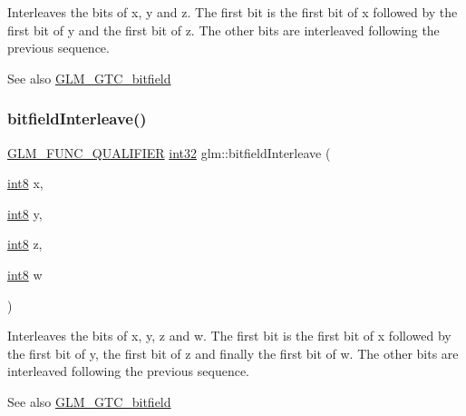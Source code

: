 Interleaves the bits of x, y and z. The first bit is the first bit of x followed by the first bit of y and the first bit of z. The other bits are interleaved following the previous sequence.

\begin{DoxySeeAlso}{See also}
\mbox{\hyperlink{group__gtc__bitfield}{G\+L\+M\+\_\+\+G\+T\+C\+\_\+bitfield}} 
\end{DoxySeeAlso}
\mbox{\label{group__gtc__bitfield_ga7da84ecc2b3a46c9c08a9f40012359cf}} 
\subsubsection{\texorpdfstring{bitfield\+Interleave()}{bitfieldInterleave()}\hspace{0.1cm}{\footnotesize\ttfamily [13/16]}}
{\footnotesize\ttfamily \mbox{\hyperlink{setup_8hpp_a33fdea6f91c5f834105f7415e2a64407}{G\+L\+M\+\_\+\+F\+U\+N\+C\+\_\+\+Q\+U\+A\+L\+I\+F\+I\+ER}} \mbox{\hyperlink{group__gtc__type__precision_ga632d8b25f6b61659f39ea4321fab92a4}{int32}} glm\+::bitfield\+Interleave (\begin{DoxyParamCaption}\item[{\mbox{\hyperlink{group__gtc__type__precision_ga96254f9c1c4506fc8eb5cf3301ce8565}{int8}}}]{x,  }\item[{\mbox{\hyperlink{group__gtc__type__precision_ga96254f9c1c4506fc8eb5cf3301ce8565}{int8}}}]{y,  }\item[{\mbox{\hyperlink{group__gtc__type__precision_ga96254f9c1c4506fc8eb5cf3301ce8565}{int8}}}]{z,  }\item[{\mbox{\hyperlink{group__gtc__type__precision_ga96254f9c1c4506fc8eb5cf3301ce8565}{int8}}}]{w }\end{DoxyParamCaption})}

Interleaves the bits of x, y, z and w. The first bit is the first bit of x followed by the first bit of y, the first bit of z and finally the first bit of w. The other bits are interleaved following the previous sequence.

\begin{DoxySeeAlso}{See also}
\mbox{\hyperlink{group__gtc__bitfield}{G\+L\+M\+\_\+\+G\+T\+C\+\_\+bitfield}} 
\end{DoxySeeAlso}
\mbox{\label{group__gtc__bitfield_ga447c0bbed9d60c14578626d8f03f3755}} 
